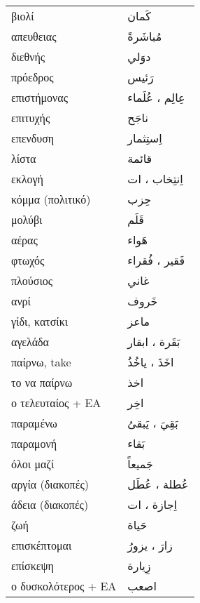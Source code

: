 \documentclass[twocolumn,a4paper]{article}
\newcommand{\ar}[1]{\textarabic{#1}}
\newcommand{\pl}{\raisebox{0.15ex}{\footnotesize ◍}}
\newcommand{\normpl}[1]{\ar{ #1، ات }}
\newcommand{\vrf}{\raisebox{0.15ex}{\footnotesize ◉}}
\newcommand{\mas}{\raisebox{0.15ex}{\footnotesize ◫}}
\begin{document}
\begin{mpsupertabular}{ P{0.5\textwidth} P{0.5\textwidth} }
βιολί                        & \ar{ كَمان } \\
απευθειας                    & \ar{ مُباشَرةً } \\
διεθνής                      & \ar{ دوَلي } \\
πρόεδρος                     & \ar{ رَئيس } \\
επιστήμονας \pl              & \ar{ عِالِم ، عُلَماء } \\
επιτυχής                     & \ar{ ناجَح } \\
επενδυση \mas                & \ar{ اِستِثمار } \\
λίστα                        & \ar{ قائمة } \\
εκλογή \pl                   & \normpl{ اِنتِخاب } \\
κόμμα (πολιτικό)             & \ar{ حِزب } \\
μολύβι                       & \ar{ قَلَم } \\
αέρας                        & \ar{ هَواء } \\
φτωχός \pl                   & \ar{ فَقير ، فُقراء  } \\
πλούσιος                     & \ar{ غاني } \\
ανρί                         & \ar{ خَروف } \\
γίδι, κατσίκι                & \ar{ ماعز } \\
αγελάδα \pl                  & \ar{ بَقَرة ، ابقار } \\
παίρνω, take \vrf            & \ar{ اخَذَ ، ياخُذُ } \\
το να παίρνω \mas            & \ar{ اخذ } \\
ο τελευταίος + ΕΑ            & \ar{ اخِر } \\
παραμένω \vrf                & \ar{ بَقِيَ ، يَبقىُ } \\
παραμονή \mas                & \ar{ بَقاء } \\
όλοι μαζί                    & \ar{ جَميعاً } \\
αργία (διακοπές) \pl         & \ar{ عُطلة ، عُطَل } \\
άδεια (διακοπές) \pl         & \normpl{ اِجازة } \\
ζωή                          & \ar{ حَياة } \\
επισκέπτομαι \vrf            & \ar{ زارَ ، يزورُ } \\
επίσκεψη \mas                & \ar{ زِيارة } \\
ο δυσκολότερος + ΕΑ          & \ar{ اصعب } \\

\end{mpsupertabular}
\end{document}
